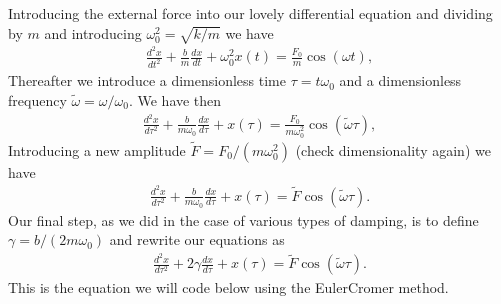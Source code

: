 \documentclass[letterpaper,10pt,english]{sphinxmanual}
\begin{document}
Introducing the external force into our lovely differential equation
and dividing by \(m\) and introducing \(\omega_0^2=\sqrt{k/m}\) we have
\begin{equation*}
\begin{split}
\frac{d^2x}{dt^2} + \frac{b}{m}\frac{dx}{dt}+\omega_0^2x(t) =\frac{F_0}{m}\cos{(\omega t)},
\end{split}
\end{equation*}
Thereafter we introduce a dimensionless time \(\tau = t\omega_0\)
and a dimensionless frequency \(\tilde{\omega}=\omega/\omega_0\). We have then
\begin{equation*}
\begin{split}
\frac{d^2x}{d\tau^2} + \frac{b}{m\omega_0}\frac{dx}{d\tau}+x(\tau) =\frac{F_0}{m\omega_0^2}\cos{(\tilde{\omega}\tau)},
\end{split}
\end{equation*}
Introducing a new amplitude \(\tilde{F} =F_0/(m\omega_0^2)\) (check dimensionality again) we have
\begin{equation*}
\begin{split}
\frac{d^2x}{d\tau^2} + \frac{b}{m\omega_0}\frac{dx}{d\tau}+x(\tau) =\tilde{F}\cos{(\tilde{\omega}\tau)}.
\end{split}
\end{equation*}
Our final step, as we did in the case of various types of damping, is
to define \(\gamma = b/(2m\omega_0)\) and rewrite our equations as
\begin{equation*}
\begin{split}
\frac{d^2x}{d\tau^2} + 2\gamma\frac{dx}{d\tau}+x(\tau) =\tilde{F}\cos{(\tilde{\omega}\tau)}.
\end{split}
\end{equation*}
This is the equation we will code below using the Euler\sphinxhyphen{}Cromer method.
\end{document}
